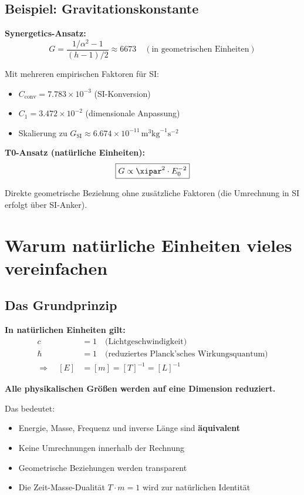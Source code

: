 	\subsection{Beispiel: Gravitationskonstante}
	
	\textbf{Synergetics-Ansatz:}
	\begin{equation}
		G = \frac{1/\alpha^2 - 1}{(h - 1)/2} \approx 6673 \quad (\text{in geometrischen Einheiten})
	\end{equation}
	
	Mit mehreren empirischen Faktoren für SI:
	\begin{itemize}
		\item $C_{\text{conv}} = 7.783 \times 10^{-3}$ (SI-Konversion)
		\item $C_1 = 3.472 \times 10^{-2}$ (dimensionale Anpassung)
		\item Skalierung zu $G_{\text{SI}} \approx 6.674 \times 10^{-11} \, \text{m}^3 \text{kg}^{-1} \text{s}^{-2}$
	\end{itemize}
	
	\textbf{T0-Ansatz (natürliche Einheiten):}
	\begin{equation}
		\boxed{G \propto \xipar^2 \cdot E_0^{-2}}
	\end{equation}
	
	Direkte geometrische Beziehung ohne zusätzliche Faktoren (die Umrechnung in SI erfolgt über SI-Anker).
	
	\section{Warum natürliche Einheiten vieles vereinfachen}
	
	\subsection{Das Grundprinzip}
	
	\begin{vorteil}
		\textbf{In natürlichen Einheiten gilt:}
		\begin{align}
			c &= 1 \quad \text{(Lichtgeschwindigkeit)} \\
			\hbar &= 1 \quad \text{(reduziertes Planck'sches Wirkungsquantum)} \\
			\Rightarrow \quad [E] &= [m] = [T]^{-1} = [L]^{-1}
		\end{align}
		
		\textbf{Alle physikalischen Größen werden auf eine Dimension reduziert.}
		
		Das bedeutet:
		\begin{itemize}
			\item Energie, Masse, Frequenz und inverse Länge sind \textbf{äquivalent}
			\item Keine Umrechnungen innerhalb der Rechnung
			\item Geometrische Beziehungen werden transparent
			\item Die Zeit-Masse-Dualität $T \cdot m = 1$ wird zur natürlichen Identität
		\end{itemize}
	\end{vorteil}
	
